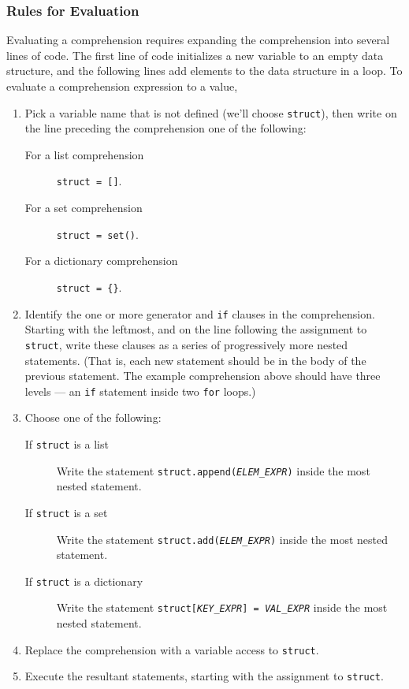 \documentclass{article}
\newcommand{\expr}[1]{\texttt{#1}}
\newcommand{\kw}[1]{\expr{#1}}
\newcommand{\mvar}[1]{\expr{\emph{\uppercase{#1}}}}
\begin{document}
\subsubsection{Rules for Evaluation}

  Evaluating a comprehension requires expanding the comprehension into several
  lines of code. The first line of code initializes a new variable to an empty
  data structure, and the following lines add elements to the data structure
  in a loop. To evaluate a comprehension expression to a value,

  \begin{enumerate}
    \item
    Pick a variable name that is not defined (we'll choose \expr{struct}), then write on the line preceding the comprehension one of the following:
    \begin{description}
      \item[For a list comprehension] \expr{struct = []}.
      \item[For a set comprehension] \expr{struct = set()}.
      \item[For a dictionary comprehension] \expr{struct = \{\}}.
    \end{description}

    \item
    Identify the one or more generator and \kw{if} clauses in the
    comprehension. Starting with the leftmost, and on the line following
    the assignment to \expr{struct}, write these clauses as a series of
    progressively more nested statements. (That is, each new statement
    should be in the body of the previous statement.
    The example comprehension above should have three levels --- an \kw{if}
    statement inside two \kw{for} loops.)

    \item
    Choose one of the following:
    \begin{sloppypar}
    \begin{description}
      \item[If \expr{struct} is a list] Write the statement \expr{struct.append(\mvar{ELEM\_EXPR})} inside the most nested statement.
      \item[If \expr{struct} is a set] Write the statement \expr{struct.add(\mvar{ELEM\_EXPR})} inside the most nested statement.
      \item[If \expr{struct} is a dictionary] Write the statement \expr{struct[\mvar{KEY\_EXPR}] = \mvar{VAL\_EXPR}} inside the most nested statement.
    \end{description}
    \end{sloppypar}

    \item
    Replace the comprehension with a variable access to \expr{struct}.

    \item
    Execute the resultant statements, starting with the assignment to \expr{struct}.

  \end{enumerate}
\end{document}
